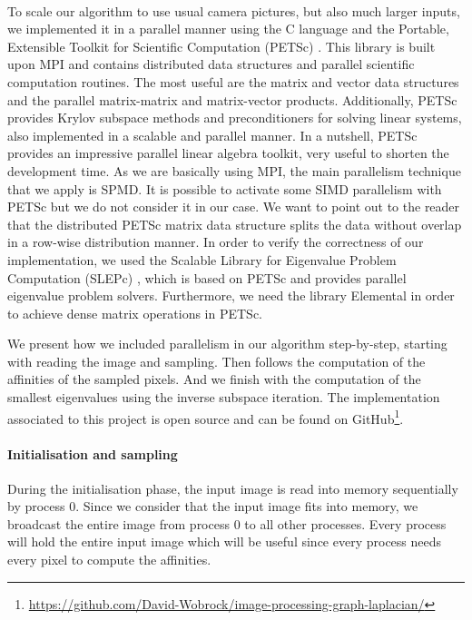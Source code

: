 \paragraph{}
To scale our algorithm to use usual camera pictures, but also much larger inputs, we implemented it in a parallel manner using the C language and the Portable, Extensible Toolkit for Scientific Computation (PETSc) \cite{petsc_web_page}.
This library is built upon MPI and contains distributed data structures and parallel scientific computation routines.
The most useful are the matrix and vector data structures and the parallel matrix-matrix and matrix-vector products.
Additionally, PETSc provides Krylov subspace methods and preconditioners for solving linear systems, also implemented in a scalable and parallel manner.
In a nutshell, PETSc provides an impressive parallel linear algebra toolkit, very useful to shorten the development time.
As we are basically using MPI, the main parallelism technique that we apply is SPMD.
It is possible to activate some SIMD parallelism with PETSc but we do not consider it in our case.
We want to point out to the reader that the distributed PETSc matrix data structure splits the data without overlap in a row-wise distribution manner.
In order to verify the correctness of our implementation, we used the Scalable Library for Eigenvalue Problem Computation (SLEPc) \cite{hernandez_slepc_2005}, which is based on PETSc and provides parallel eigenvalue problem solvers.
Furthermore, we need the library Elemental \cite{poulson_elemental_2013} in order to achieve dense matrix operations in PETSc.

We present how we included parallelism in our algorithm step-by-step, starting with reading the image and sampling.
Then follows the computation of the affinities of the sampled pixels.
And we finish with the computation of the smallest eigenvalues using the inverse subspace iteration.
The implementation associated to this project is open source and can be found on GitHub\footnote{\url{https://github.com/David-Wobrock/image-processing-graph-laplacian/}}.

\paragraph{Initialisation and sampling}
During the initialisation phase, the input image is read into memory sequentially by process 0.
Since we consider that the input image fits into memory, we broadcast the entire image from process 0 to all other processes.
Every process will hold the entire input image which will be useful since every process needs every pixel to compute the affinities.

